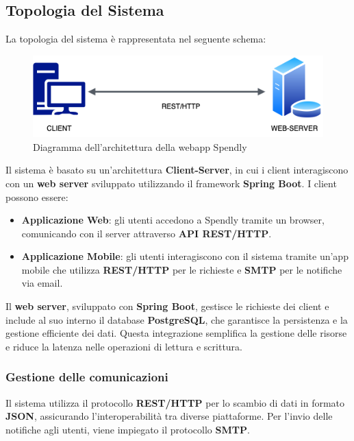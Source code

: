 \subsection{Topologia del Sistema}

La topologia del sistema è rappresentata nel seguente schema:

\begin{figure}[h]
\centering
\includegraphics[scale=0.75]{images/topologia.png}
\caption{Diagramma dell’architettura della webapp Spendly}
\end{figure}


Il sistema è basato su un’architettura \textbf{Client-Server}, in cui i client interagiscono con un \textbf{web server} sviluppato utilizzando il framework \textbf{Spring Boot}. I client possono essere:

\begin{itemize}
\item \textbf{Applicazione Web}: gli utenti accedono a Spendly tramite un browser, comunicando con il server attraverso \textbf{API REST/HTTP}.
\item \textbf{Applicazione Mobile}: gli utenti interagiscono con il sistema tramite un’app mobile che utilizza \textbf{REST/HTTP} per le richieste e \textbf{SMTP} per le notifiche via email.
\end{itemize}


Il \textbf{web server}, sviluppato con \textbf{Spring Boot}, gestisce le richieste dei client e include al suo interno il database \textbf{PostgreSQL}, che garantisce la persistenza e la gestione efficiente dei dati. Questa integrazione semplifica la gestione delle risorse e riduce la latenza nelle operazioni di lettura e scrittura.

\subsubsection{Gestione delle comunicazioni}
Il sistema utilizza il protocollo \textbf{REST/HTTP} per lo scambio di dati in formato \textbf{JSON}, assicurando l’interoperabilità tra diverse piattaforme. Per l’invio delle notifiche agli utenti, viene impiegato il protocollo \textbf{SMTP}.

